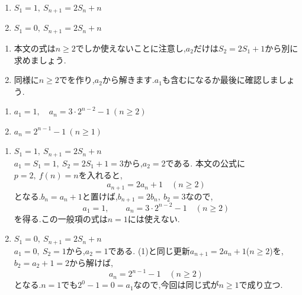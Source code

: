     \noindent {}\par\nobreak
    \begin{enumerate}[label=(\arabic*),parsep=3pt,format=\bookitemlink{example-summation-2}{problem}{answer}]
      \item $\displaystyle S_1=1,\ S_{n+1}=2S_n+n$
      \item $\displaystyle S_1=0,\ S_{n+1}=2S_n+n$
    \end{enumerate}

    \noindent{}\par\nobreak
    \begin{enumerate}[label=(\arabic*),parsep=3pt,format=\bookitemlink{example-summation-2}{hint}{problem}]
      \item 本文の式は$n\ge2$でしか使えないことに注意し,$a_2$だけは$S_2=2S_1+1$から別に求めましょう.
      \item 同様に$n\ge2$でを作り,$a_2$から解きます.$a_1$も含むになるか最後に確認しましょう.
    \end{enumerate}

    \noindent{}\par\nobreak
    \begin{enumerate}[label=(\arabic*),parsep=3pt,format=\bookitemlink{example-summation-2}{answer}{problem}]
      \item $\displaystyle a_1=1,\quad a_n=3\cdot2^{n-2}-1\ (n\ge2)$
      \item $\displaystyle a_n=2^{n-1}-1\ (n\ge1)$
    \end{enumerate}

    \noindent{}\par\nobreak
    \begin{enumerate}[label=(\arabic*),parsep=3pt,format=\bookitemlink{example-summation-2}{solution}{problem}]
    \item $\displaystyle S_1=1,\ S_{n+1}=2S_n+n$\\
        $a_1=S_1=1,\ S_2=2S_1+1=3$から,$a_2=2$である.
        本文の公式に$p=2,\ f(n)=n$を入れると,
        \[
          a_{n+1}=2a_n+1\quad(n\ge2)
        \]
        となる.$b_n=a_n+1$と置けば,$b_{n+1}=2b_n,\ b_2=3$なので,
        \[
          a_1=1,\qquad a_n=3\cdot2^{n-2}-1\quad(n\ge2)
        \]
        を得る.この一般項の式は$n=1$には使えない.
    \item $\displaystyle S_1=0,\ S_{n+1}=2S_n+n$\\
        $a_1=0,\ S_2=1$から,$a_2=1$である.
        (1)と同じ更新$a_{n+1}=2a_n+1$($n\ge2$)を,$b_2=a_2+1=2$から解けば,
        \[
          a_n=2^{n-1}-1\quad(n\ge2)
        \]
        となる.$n=1$でも$2^0-1=0=a_1$なので,今回は同じ式が$n\ge1$で成り立つ.
    \end{enumerate}
